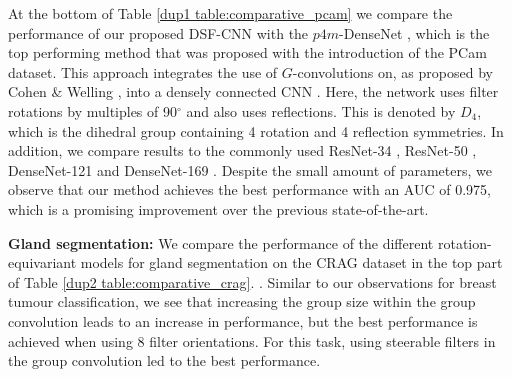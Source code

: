 \documentclass[journal]{IEEEtran}
\newcommand\mg[1]{{\color{black}{#1}}}
\begin{document}
	    At the bottom of Table \ref{dup1 table:comparative_pcam} we compare the performance of our proposed DSF-CNN with the $p4m$-DenseNet \cite{veeling2018rotation}, which is the top performing method that was proposed with the introduction of the PCam dataset. This approach integrates the use of $G$-convolutions on, as proposed by Cohen \& Welling \cite{cohen2016group}, into a densely connected CNN \cite{densenet}. Here, the network uses filter rotations by multiples of 90$^{\circ}$ and also uses reflections. This is denoted by $D_4$, which is the dihedral group containing 4 rotation and 4 reflection symmetries. In addition, we compare results to the commonly used ResNet-34 \cite{he2016deep}, ResNet-50 \cite{he2016deep}, DenseNet-121 \cite{densenet} and DenseNet-169 \cite{densenet}. Despite the small amount of parameters, we observe that our method achieves the best performance with an AUC of 0.975, which is a promising improvement over the previous state-of-the-art.
	    
	    \textbf{Gland segmentation: }We compare the performance of the different rotation-equivariant models for gland segmentation on the CRAG dataset in the top part of Table \ref{dup2 table:comparative_crag}. \mg{For this experiment, when comparing different rotation-equivariant approaches, we choose to only assess the performance of conventional CNNs, standard $G$-CNNs and steerable $G$-CNNs. This is because our previous experiment on breast tumour classification indicates that $G$-CNNs are capable of achieving a superior result over competing rotation-equivariant approaches}. Similar to our observations for breast tumour classification, we see that increasing the group size within the group convolution leads to an increase in performance, but the best performance is achieved when using 8 filter orientations. For this task, using steerable filters in the group convolution led to the best performance.  
	    
\end{document}
